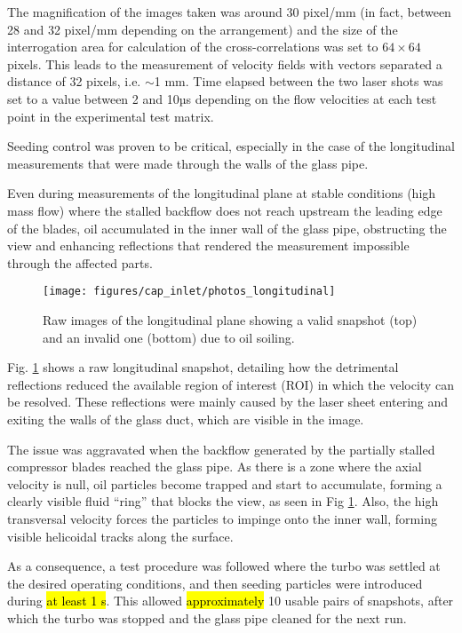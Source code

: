 The magnification of the images taken was around 30 pixel/mm (in fact, between 28 and 32 pixel/mm depending on the arrangement) and the size of the interrogation area for calculation of the cross-correlations was set to $64\times 64$ pixels. This leads to the measurement of velocity fields with vectors separated a distance of 32 pixels, i.e. $\sim$1 mm. Time elapsed between the two laser shots was set to a value between 2 and 10µs depending on the flow velocities at each test point in the experimental test matrix.

Seeding control was proven to be critical, especially in the case of the longitudinal measurements that were made through the walls of the glass pipe.

Even during measurements of the longitudinal plane at stable conditions (high mass flow) where the stalled backflow does not reach upstream the leading edge of the blades, oil accumulated in the inner wall of the glass pipe, obstructing the view and enhancing reflections that rendered the measurement impossible through the affected parts. 

\begin{figure}[!t]
\centering
\texttt{[image: figures/cap\_inlet/photos\_longitudinal]}
\caption{Raw images of the longitudinal plane showing a valid snapshot (top) and an invalid one (bottom) due to oil soiling.}
\label{fig:photos_longitudinal}
\end{figure}

Fig. \ref{fig:photos_longitudinal} shows a raw longitudinal snapshot, detailing how the detrimental reflections reduced the available region of interest (ROI) in which the velocity can be resolved. These reflections were mainly caused by the laser sheet entering and exiting the walls of the glass duct, which are visible in the image.

The issue was aggravated when the backflow generated by the partially stalled compressor blades reached the glass pipe. As there is a zone where the axial velocity is null, oil particles become trapped and start to accumulate, forming a clearly visible fluid ``ring'' that blocks the view, as seen in Fig \ref{fig:photos_longitudinal}. Also, the high transversal velocity forces the particles to impinge onto the inner wall, forming visible helicoidal tracks along the surface.

As a consequence, a test procedure was followed where the turbo was settled at the desired operating conditions, and then seeding particles were introduced during \hl{at least 1 s}. This allowed \hl{approximately} 10 usable pairs of snapshots, after which the turbo was stopped and the glass pipe cleaned for the next run.

